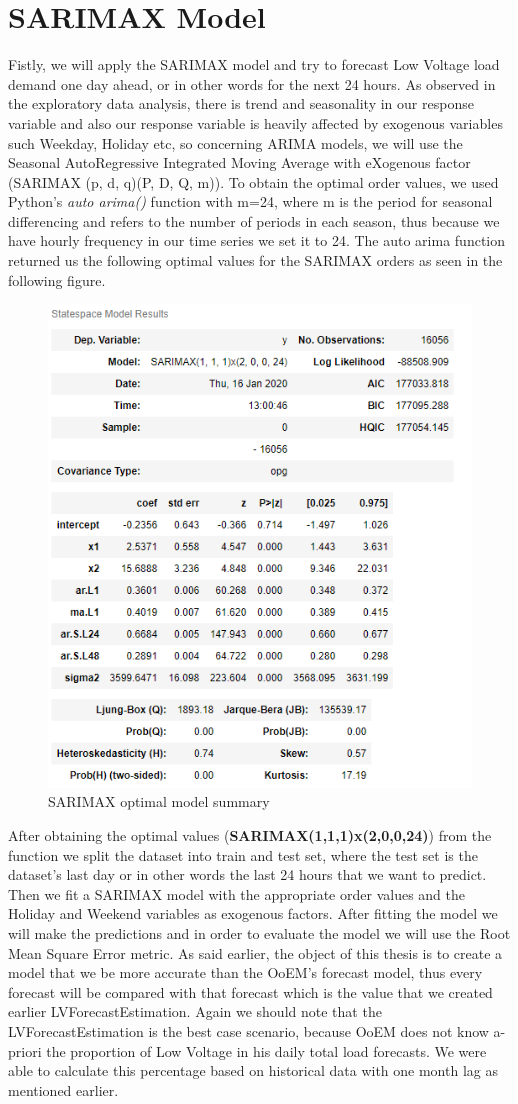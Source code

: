 \section{SARIMAX Model}
Fistly, we will apply the SARIMAX model and try to forecast Low Voltage load demand one day ahead, or in other words for the next 24 hours. As observed in the exploratory data analysis, there is trend and seasonality in our response variable and also our response variable is heavily affected by exogenous variables such Weekday, Holiday etc, so concerning ARIMA models, we will use the  Seasonal AutoRegressive Integrated Moving Average with eXogenous factor (SARIMAX (p, d, q)(P, D, Q, m)). To obtain the optimal order values, we used Python's \textit{auto arima()} \cite{autoarima} function with m=24, where m is the period for seasonal differencing and refers to the number of periods in each season, thus because we have hourly frequency in our time series we set it to 24. The auto arima function returned us the following optimal values for the SARIMAX orders as seen in the following figure.
\begin{figure}[ht!]
\centering
\includegraphics[width=0.5\linewidth]{project/modelsum.PNG}
\caption{SARIMAX optimal model summary}

\end{figure}
After obtaining the optimal values (\textbf{SARIMAX(1,1,1)x(2,0,0,24)}) from the function we split the dataset into train and test set, where the test set is the dataset's last day or in other words the last 24 hours that we want to predict. Then we fit a SARIMAX model with the appropriate order values and the Holiday and Weekend variables as exogenous factors. After fitting the model we will make the predictions and in order to evaluate the model we will use the Root Mean Square Error metric.
As said earlier, the object of this thesis is to create a model that we be more accurate than the OoEM's forecast model, thus every forecast will be compared with that forecast which is the value that we created earlier LVForecastEstimation. Again we should note that the LVForecastEstimation is the best case scenario, because OoEM does not know a-priori the proportion of Low Voltage in his daily total load forecasts. We were able to calculate this percentage based on historical data with one month lag as mentioned earlier. 
